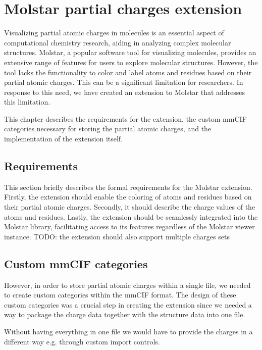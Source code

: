 \documentclass[
  digital,     %
  oneside,     %
  nosansbold,  %
  nocolorbold, %
  lof,         %
  lot,         %
]{fithesis4}
\begin{document}
\chapter{Molstar partial charges extension}
\label{chapter:molstar_partial_charges_extension}

Visualizing partial atomic charges in molecules is an essential aspect of computational chemistry research, aiding in analyzing complex molecular structures. Molstar, a popular software tool for visualizing molecules, provides an extensive range of features for users to explore molecular structures. However, the tool lacks the functionality to color and label atoms and residues based on their partial atomic charges. This can be a significant limitation for researchers. In response to this need, we have created an extension to Molstar that addresses this limitation.

This chapter describes the requirements for the extension, the custom mmCIF categories necessary for storing the partial atomic charges, and the implementation of the extension itself.

\section{Requirements}
\label{section:requirements}

This section briefly describes the formal requirements for the Molstar extension. Firstly, the extension should enable the coloring of atoms and residues based on their partial atomic charges. Secondly, it should describe the charge values of the atoms and residues. Lastly, the extension should be seamlessly integrated into the Molstar library, facilitating access to its features regardless of the Molstar viewer instance.
TODO: the extension should also support multiple charges sets

\section{Custom mmCIF categories}
\label{section:custom_mmcif_categories}

However, in order to store partial atomic charges within a single file, we needed to create custom categories within the mmCIF format.
The design of these custom categories was a crucial step in creating the extension since we needed a way to package the charge data together with the structure data into one file.

Without having everything in one file we would have to provide the charges in a different way e.g. through custom import controls.
\end{document}
